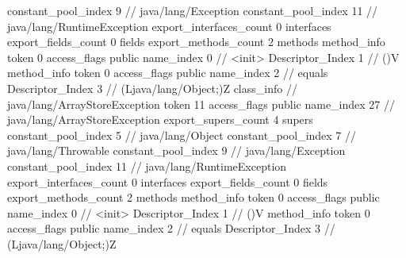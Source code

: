 {{{{				constant_pool_index	9		// java/lang/Exception
				constant_pool_index	11		// java/lang/RuntimeException
			}
			export_interfaces_count	0
			interfaces {
			}
			export_fields_count	0
			fields {
			}
			export_methods_count	2
			methods {
				method_info {
					token	0
					access_flags	public
					name_index	0		// <init>
					Descriptor_Index	1		// ()V
				}
				method_info {
					token	0
					access_flags	public
					name_index	2		// equals
					Descriptor_Index	3		// (Ljava/lang/Object;)Z
				}
			}
		}
		class_info {		// java/lang/ArrayStoreException
			token	11
			access_flags	public
			name_index	27		// java/lang/ArrayStoreException
			export_supers_count	4
			supers {
				constant_pool_index	5		// java/lang/Object
				constant_pool_index	7		// java/lang/Throwable
				constant_pool_index	9		// java/lang/Exception
				constant_pool_index	11		// java/lang/RuntimeException
			}
			export_interfaces_count	0
			interfaces {
			}
			export_fields_count	0
			fields {
			}
			export_methods_count	2
			methods {
				method_info {
					token	0
					access_flags	public
					name_index	0		// <init>
					Descriptor_Index	1		// ()V
				}
				method_info {
					token	0
					access_flags	public
					name_index	2		// equals
					Descriptor_Index	3		// (Ljava/lang/Object;)Z
				}
			}
		}
	}
}
